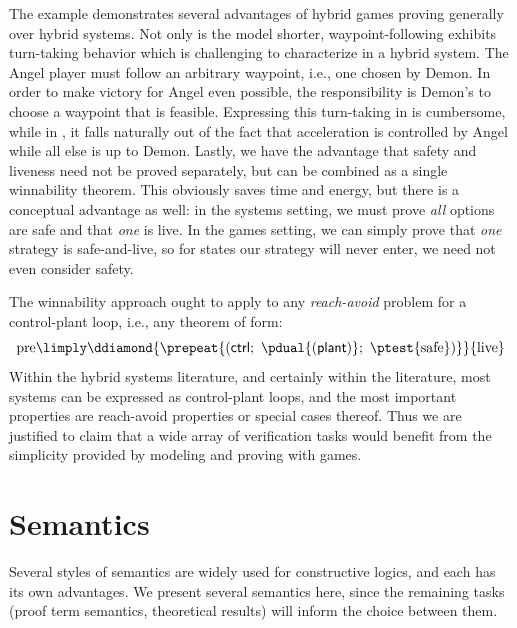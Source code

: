 \documentclass[12pt]{cmuthesis}
\theoremstyle{definition}
\theoremstyle{remark}
\newcommand{\ctrl}{\textsf{ctrl}\xspace}
\newcommand{\plant}{\textsf{plant}\xspace}
\newcommand{\rref}[2][]{\prettyref{#2}}
\newcommand{\allregion}{\mathcal{X}}
\begin{document}
The example demonstrates several advantages of hybrid games proving generally over hybrid systems.
Not only is the model shorter, waypoint-following exhibits turn-taking behavior which is challenging to characterize in a hybrid system.
The Angel player must follow an arbitrary waypoint, i.e., one chosen by Demon.
In order to make victory for Angel even possible, the responsibility is Demon's to choose a waypoint that is feasible.
Expressing this turn-taking in \rref{thm:live} is cumbersome, while in \rref{thm:angel-wins-gen}, it falls naturally out of the fact that acceleration is controlled by Angel while all else is up to Demon.
Lastly, we have the advantage that safety and liveness need not be proved separately, but can be combined as a single winnability theorem.
This obviously saves time and energy, but there is a conceptual advantage as well: in the systems setting, we must prove \emph{all} options are safe and that \emph{one} is live.
In the games setting, we can simply prove that \emph{one} strategy is safe-and-live, so for states our strategy will never enter, we need not even consider safety.

The winnability approach ought to apply to any \emph{reach-avoid} problem for a control-plant loop, i.e., any theorem of form:
\[\text{pre} \limply \ddiamond{\prepeat{(\ctrl;~\pdual{(\plant)};~\ptest{\text{safe}})}}{\text{live}}\]
Within the hybrid systems literature, and certainly within the \dL literature, most systems can be expressed as control-plant loops, and the most important properties are reach-avoid properties or special cases thereof.
Thus we are justified to claim that a wide array of verification tasks would benefit from the simplicity provided by modeling and proving with games.

\section{Semantics}
Several styles of semantics are widely used for constructive logics, and each has its own advantages.
We present several semantics here, since the remaining tasks (proof term semantics, theoretical results) will inform the choice between them.
\newcommand{\allcon}{\allregion}
\newcommand{\somesemi}[2]{\epsilon #1~|~#2}

\newcommand{\rzF}[2]{#1 \vdash #2}
\newcommand{\rzA}[3]{\langle{#2}\rangle(#1)=(#3)}
\newcommand{\rzD}[3]{[{#2}](#1)=(#3)}
\newcommand{\rzFst}[1]{#1_0}
\newcommand{\rzSnd}[1]{#1_1}
\newcommand{\rzThd}[1]{#1_2}
\newcommand{\rzFrt}[1]{#1_3}
\newcommand{\rzApp}[2]{#1#2}
\newcommand{\sa}{\omega}
\renewcommand{\sb}{\nu}
\newcommand{\Sc}{\mu}
\renewcommand{\aa}{a}
\newcommand{\ab}{A}
\newcommand{\ac}{\aleph}
\newcommand{\da}{d}
\newcommand{\db}{D}
\newcommand{\dc}{\delta}
\newcommand{\allRz}{\mathcal{R}\mathbf{z}}
\newcommand{\mto}{\rightharpoonup}
\end{document}
